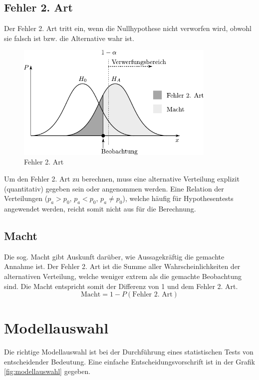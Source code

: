 \subsection{Fehler 2. Art}
Der Fehler 2. Art tritt ein, wenn die Nullhypothese nicht verworfen wird, 
obwohl sie falsch ist bzw. die Alternative wahr ist.

\begin{figure}[h!]
	\centering
	\includegraphics[width=0.85\textwidth]{fehler-zweiter-art.pdf}
	\caption{Fehler 2. Art}
	\label{fig:fehler2}
\end{figure}

Um den Fehler 2. Art zu berechnen, muss eine alternative Verteilung 
explizit (quantitativ) gegeben sein oder angenommen werden. Eine Relation
der Verteilungen ($p_a > p_0$, $p_a < p_0$, $p_a \neq p_0$), welche 
häufig für Hypothesentests angewendet werden, reicht somit nicht aus für
die Berechnung.

\subsection{Macht}
Die sog. Macht gibt Auskunft darüber, wie Aussagekräftig die gemachte
Annahme ist. Der Fehler 2. Art ist die Summe aller Wahrscheinlichkeiten
der alternativen Verteilung, welche weniger extrem als die gemachte 
Beobachtung sind. Die Macht entspricht somit der Differenz von 1 und 
dem Fehler 2. Art.
\[  
	\text{Macht} = 1 - P(\text{Fehler 2. Art})
\]

\clearpage
\newpage
\section{Modellauswahl}
Die richtige Modellauswahl ist bei der Durchführung eines statistischen
Tests von entscheidender Bedeutung. Eine einfache Entscheidungsvorschrift
ist in der Grafik \ref{fig:modellauswahl} gegeben.

